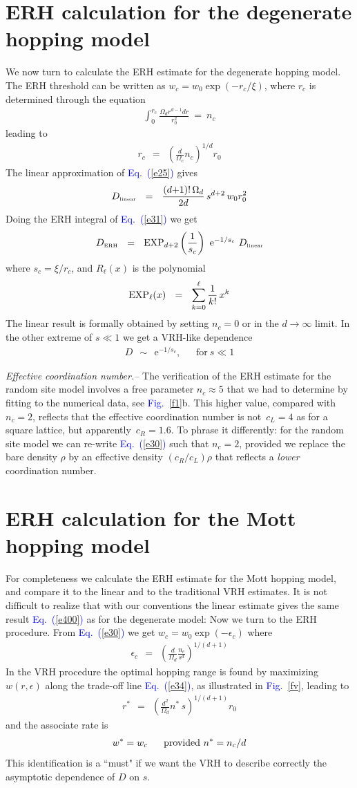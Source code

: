 \documentclass[aps,prb,floats,floatfix,twocolumn]{revtex4}
\newcommand{\eexp}{\mbox{e}^}
\newcommand{\tbox}[1]{\mbox{\tiny #1}}
\newcommand{\mylabel}[1]{\label{#1}}
\newcommand{\beq}{\begin{eqnarray}}
\newcommand{\eeq}{\end{eqnarray}}
\newcommand{\be}[1]{\begin{eqnarray}\ifthenelse{#1=-1}
{\nonumber}{\ifthenelse{#1=0}{}{\mylabel{e#1}}}}
\newcommand{\Eq}[1]{\textcolor{blue}{Eq.\!\!~(\ref{#1})}}
\newcommand{\Fig}[1]{\textcolor{blue}{Fig.}\!\!~\ref{#1}}
\begin{document}
\section{ERH calculation for the degenerate hopping model}
\label{sN}

We now turn to calculate the ERH estimate for the
degenerate hopping model. The ERH threshold 
can be written as  $w_c=w_0\exp(-r_c/\xi)$, 
where $r_c$ is determined through the equation  
%
\beq
\int_0^{r_c} \frac{\Omega_d r^{d-1} dr}{r_0^2} \ = \  n_c 
\eeq
%
leading to 
%
\beq
r_c  \ \ = \ \ \left(\frac{d}{\Omega_c}n_c\right)^{1/d}  r_0
\eeq
%
The linear approximation of \Eq{e25} gives 
%
\be{400}
D_{\tbox{linear}} \ \ = \ \  
\frac{(d{+}1)!\,\Omega_d}{2d} \, s^{d{+}2} \, w_0 r_0^2
\eeq
%
Doing the ERH integral of \Eq{e31} we get 
%
\be{40}
D_{\tbox{ERH}} \ \ = \ \  
\mathrm{EXP}_{d{+}2}\left(\frac{1}{s_c}\right)  \  \eexp{-1/s_c}  \ D_{\tbox{linear}}
\eeq
%
where $s_c=\xi/r_c$, and $R_{\ell}(x)$ is the polynomial
%
\be{41}
\mathrm{EXP}_{\ell}(x) \ \ = \ \ \sum_{k=0}^{\ell} \frac{1}{k!} \, x^k
\eeq
%
The linear result is formally obtained 
by setting ${n_c=0}$ or in the $d\rightarrow\infty$ limit. 
In the other extreme of ${s\ll1}$ 
we get a VRH-like dependence
%
\beq
D \ \ \sim \ \ \eexp{-1/s_c}, \ \ \ \ \ \ \ \text{for} \ s\ll1 
\eeq

{\em Effective coordination number.-- } 
The verification of the ERH estimate for the random site model 
involves a free parameter ${n_c\approx5}$ that we had to determine by 
fitting to the numerical data, see \Fig{f1}b.  
This higher value, compared with ${n_c=2}$, 
reflects that the effective coordination number 
is not~$c_L=4$ as for a square lattice,
but apparently~$c_R=1.6$. To phrase it differently: 
for the random site model we can re-write \Eq{e30}
such that ${n_c=2}$, provided we replace the bare 
density $\rho$ by an effective density $(c_R/c_L)\rho$
that reflects a {\em lower} coordination number. 


\section{ERH calculation for the Mott hopping model}
\label{sM}

For completeness we calculate the ERH estimate for the Mott hopping model, 
and compare it to the linear and to the traditional VRH estimates.
It is not difficult to realize that with our conventions the linear  
estimate gives the same result \Eq{e400} as for the degenerate model:
Now we turn to the ERH procedure.
From \Eq{e30} we get  $w_c=w_0\exp(-\epsilon_c)$ where 
%
\beq
\epsilon_c \ \ = \ \ \left( \frac{d}{\Omega_d} \frac{n_c}{s^d} \right)^{1/(d+1)}
\eeq 
%
In the VRH procedure the optimal hopping range 
is found by maximizing $w(r,\epsilon)$ 
along the trade-off line \Eq{e34}, 
as illustrated in \Fig{fv}, leading to 
%
\beq
r^* \ \ = \ \ \left(\frac{d^2}{\Omega_d} n^* \, s \right)^{1/(d+1)} r_0
\eeq 
%
and the associate rate is 
%
\be{46}
w^* = w_c \ \ \ \ \ \text{provided} \ n^*=n_c/d
\eeq 
%
This identification is a ``must" if we want the VRH to 
describe correctly the asymptotic dependence of $D$ on $s$.
\end{document}
